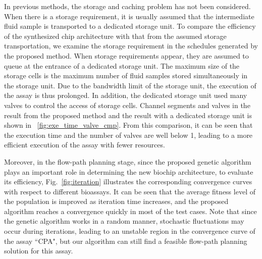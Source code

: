 %   


In previous methods, the storage and caching problem has not been considered.
When there is a storage requirement, it is usually assumed that
the intermediate fluid sample is transported to a dedicated storage unit.
To compare the efficiency of the synthesized chip architecture with that from
the assumed storage transportation, we examine the storage requirement in the
schedules generated by the
proposed method. When storage requirements appear, they are assumed to queue
at the
entrance of a dedicated storage unit.
The maximum size of the storage cells is the
maximum number of fluid samples stored simultaneously in the storage unit.
Due to the bandwidth limit of
the storage unit, the execution of the assay is thus prolonged. In addition,
the dedicated storage unit used many valves to control the access of storage
cells.
Channel segments and
valves in the result from the proposed method and the result with a dedicated
storage unit is shown in \figname~\ref{fig:exe_time_valve_cmp}. From this
comparison,
it can be seen that the execution time
and the number of valves are well below 1,
leading to a more efficient execution of the assay with fewer resources.




%

Moreover, in the flow-path planning stage, since the proposed genetic algorithm plays an important role in determining the new biochip architecture, to evaluate its efficiency, Fig.~\ref{fig:iteration} illustrates the corresponding convergence curves with respect to different bioassays. It can be seen that the average fitness level of the population is improved as iteration time increases, and the proposed algorithm reaches a convergence quickly in most of the test cases. Note that since the genetic algorithm works in a random manner, stochastic fluctuations may occur during iterations, leading to an unstable region in the convergence curve of the assay ``CPA", but our algorithm can still find a feasible flow-path planning solution for this assay.





